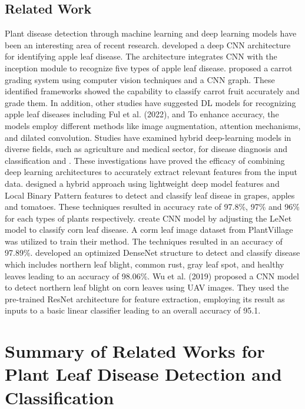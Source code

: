 \subsection{Related Work}
\sectionTitleBody
Plant disease detection through machine learning
	and deep learning models have been an interesting area of recent research. \cite{jiangRealTimeDetectionApple2019a} developed a deep CNN architecture for identifying
	apple leaf disease. The architecture integrates CNN with the inception
	module to recognize five types of apple leaf disease. \cite{bukumiraCarrotGradingSystem2022a} proposed a carrot grading system using computer vision
	techniques and a CNN graph. These identified frameworks showed the capability
	to classify carrot fruit accurately and grade them. In addition, other
	studies have suggested DL models for recognizing apple leaf diseases
	including Ful et al. (2022), \cite{bansalDiseaseDetectionApple2021} and \cite{khanDeepDiagnosisRealtime2022a} To enhance accuracy, the models employ different methods like
	image augmentation, attention mechanisms, and dilated convolution.
	Studies have examined hybrid deep-learning models in diverse fields,
	such as agriculture and medical sector, for disease diagnosis and
	classification \citep{zhangInstancebasedDeepTransfer2023a} and \citep{waleedNovelDeepLearning2022}. These
	investigations have proved the efficacy of combining deep learning
	architectures to accurately extract relevant features from the input
	data. \cite{hosnyMultiClassClassificationPlant2023a} designed a hybrid approach using lightweight
	deep model features and Local Binary Pattern features to detect and
	classify leaf diseae in grapes, apples and tomatoes. These techniques
	resulted in accuracy rate of 97.8\%, 97\% and 96\% for each types
	of plants respectively. \citep{ahilaMaizeLeafDisease2019} create CNN model
	by adjusting the LeNet model to classify corn leaf disease. A corm
	leaf image dataset from PlantVillage was utilized to train their method.
	The techniques resulted in an accuracy of 97.89\%. \citep{waheedOptimizedDenseConvolutional2020a}
	developed an optimized DenseNet structure to detect and classify disease
	which includes northern leaf blight, common rust, gray leaf spot,
	and healthy leaves leading to an accuracy of 98.06\%. Wu et al. (2019)
	proposed a CNN model to detect northern leaf blight on corn leaves
	using UAV images. They used the pre-trained ResNet architecture for
	feature extraction, employing its result as inputs to a basic linear
	classifier leading to an overall accuracy of 95.1.
\newpage
\section{Summary of Related Works for Plant Leaf Disease Detection and Classification}

